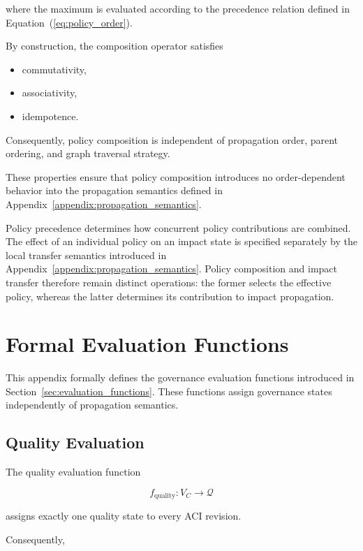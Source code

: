 \documentclass[10pt]{article}
\begin{document}
where the maximum is evaluated according to the precedence relation defined in Equation~(\ref{eq:policy_order}).

By construction, the composition operator satisfies

\begin{itemize}
	\item commutativity,
	\item associativity,
	\item idempotence.
\end{itemize}

Consequently, policy composition is independent of propagation order, parent ordering, and graph traversal strategy.

These properties ensure that policy composition introduces no order-dependent behavior into the propagation semantics defined in Appendix~\ref{appendix:propagation_semantics}.

Policy precedence determines how concurrent policy contributions are combined.
The effect of an individual policy on an impact state is specified separately
by the local transfer semantics introduced in
Appendix~\ref{appendix:propagation_semantics}. Policy composition and impact
transfer therefore remain distinct operations: the former selects the effective
policy, whereas the latter determines its contribution to impact propagation.

\section{Formal Evaluation Functions}
\label{appendix:evaluation_functions}

This appendix formally defines the governance evaluation functions introduced in Section~\ref{sec:evaluation_functions}. These functions assign governance states independently of propagation semantics.

\subsection{Quality Evaluation}

The quality evaluation function

\begin{equation}
	f_{\mathrm{quality}} : V_C \rightarrow \mathcal Q
	\label{eq:quality_function}
\end{equation}

assigns exactly one quality state to every ACI revision.

Consequently,
\end{document}
